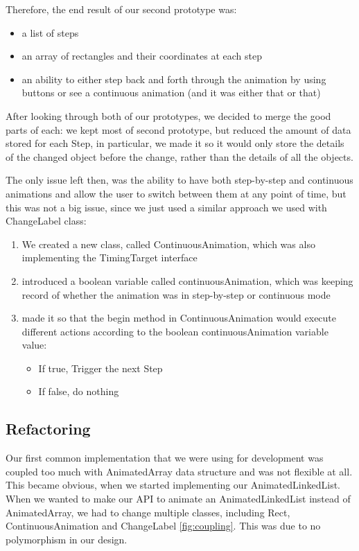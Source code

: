 \documentclass{l3proj}
\begin{document}
Therefore, the end result of our second prototype was:
\begin{itemize}
	\item a list of steps
	\item an array of rectangles and their coordinates at each step
	\item an ability to either step back and forth through the animation by using buttons or see a continuous animation (and it was either that or that)
\end{itemize}

After looking through both of our prototypes, we decided to merge the good parts of each: we kept most of second prototype, but reduced the amount of data stored for each Step, in particular, we made it so it would only store the details of the changed object before the change, rather than the details of all the objects.

The only issue left then, was the ability to have both step-by-step and continuous animations and allow the user to switch between them at any point of time, but this was not a big issue, since we just used a similar approach we used with ChangeLabel class:
\begin{enumerate}
	\item We created a new class, called ContinuousAnimation, which was also implementing the TimingTarget interface
	\item introduced a boolean variable called continuousAnimation, which was keeping record of whether the animation was in step-by-step or continuous mode
	\item made it so that the begin method in ContinuousAnimation would execute different actions according to the boolean continuousAnimation variable value:
	\begin{itemize}
		\item If true, Trigger the next Step
		\item If false, do nothing
	\end{itemize}
\end{enumerate}

\subsection{Refactoring}
\label{PE:refactoring}

Our first common implementation that we were using for development was coupled too much with AnimatedArray data structure and was not flexible at all. This became obvious, when we started implementing our AnimatedLinkedList. When we wanted to make our API to animate an AnimatedLinkedList instead of AnimatedArray, we had to change multiple classes, including Rect, ContinuousAnimation and ChangeLabel \ref{fig:coupling}. This was due to no polymorphism in our design.
\end{document}
